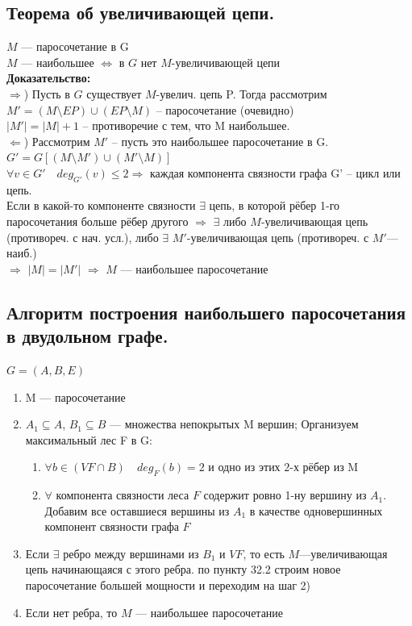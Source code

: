 \documentclass[12pt]{article}
\begin{document}
	\subsection{Теорема об увеличивающей цепи.}
		$M$ — паросочетание в G\\
		$M$ — наибольшее $\Leftrightarrow$ в $G$ нет $M$-увеличивающей цепи\\
	\textbf{Доказательство:}\\
		$\Rightarrow$) Пусть в $G$ существует $M$-увелич. цепь P. Тогда рассмотрим $M' = (M \setminus EP) \cup (EP \setminus M)$ – паросочетание (очевидно)\\
		$|M'| = |M| + 1$ – противоречие с тем, что M наибольшее.\\
		$\Leftarrow$) Рассмотрим $M'$ – пусть это наибольшее паросочетание в G.\\
		$G' = G[(M \setminus M') \cup (M' \setminus M )]$\\
		$\forall v \in G' \quad deg_{G'}(v) \leqslant 2 \Rightarrow$ каждая компонента связности графа G' – цикл или цепь.\\
		Если в какой-то компоненте связности $\exists$ цепь, в которой рёбер 1-го паросочетания больше рёбер другого $\Rightarrow$ $\exists$ либо $M$-увеличивающая цепь (противореч. с нач. усл.), либо $\exists$ $M'$-увеличивающая цепь (противореч. с $M'$—наиб.)\\
		$\Rightarrow$ $|M| = |M'|$ $\Rightarrow$ $M$ — наибольшее паросочетание\\
		\qedsymbol
	\subsection{Алгоритм построения наибольшего паросочетания в двудольном графе.}
		$G = (A,B,E)$
		\begin{enumerate}
			\item M — паросочетание
			\item $A_1 \subseteq A$, $B_1 \subseteq B$ — множества непокрытых M вершин; Организуем максимальный лес F в G:
			\begin{enumerate}
				\item $\forall b \in (VF \cap B) \quad deg_F(b) = 2$ и одно из этих $2$-х рёбер из M
				\item $\forall$ компонента связности леса $F$ содержит ровно 1-ну вершину из $A_1$. Добавим все оставшиеся вершины из $A_1$ в качестве одновершинных компонент связности графа $F$
			\end{enumerate}
			\item Если $\exists$ ребро между вершинами из $B_1$ и $VF$, то есть $M$—увеличивающая цепь начинающаяся с этого ребра. по пункту 32.2 строим новое паросочетание большей мощности и переходим на шаг 2)
			\item Если нет ребра, то $M$ — наибольшее паросочетание
		\end{enumerate}
\end{document}

